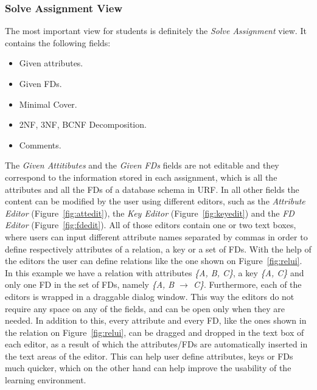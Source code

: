 \subsubsection{Solve Assignment View}
The most important view for students is definitely the \textit{Solve Assignment} view.
It contains the following fields:

\begin{itemize}
	\item Given attributes.
	\item Given FDs.
	\item Minimal Cover.
	\item 2NF, 3NF, BCNF Decomposition.
	\item Comments.
\end{itemize}

The \textit{Given Attitibutes} and the \textit{Given FDs} fields are not editable
and they correspond	to the information stored in each assignment, which is all the 
attributes and all the FDs of a database schema in URF. In all other fields 
the content can be modified by the user using different editors,
such as the \textit{Attribute Editor} (Figure~\ref{fig:attedit}), 
the \textit{Key Editor} (Figure~\ref{fig:keyedit}) and the \textit{FD Editor}
(Figure~\ref{fig:fdedit}).
All of those editors contain one or two text boxes, where users can input 
different attribute names separated by commas
in order to define respectively attributes of a relation, a key or a set of FDs. With
the help of the editors the user can define relations like the one shown on 
Figure~\ref{fig:relui}. In this example we have a relation with attributes 
\textit{\{A, B, C\}}, a key \textit{\{A, C\}} and only one FD in the set of FDs,
namely \textit{\{A, B $\rightarrow$ C\}}.  Furthermore,
each of the editors is wrapped in a draggable dialog window. 
This way the editors do not require any space on any of the fields, 
and can be open only when they are needed. In addition to this, every attribute and every FD,
like the ones shown in the relation on Figure~\ref{fig:relui}, can be dragged and
dropped in the text box of each editor, as a result of which the attributes/FDs
are automatically inserted in the text areas of the editor.
This can help user define attributes, keys or
FDs much quicker, which on the other hand can help improve the usability of 
the learning environment. 

